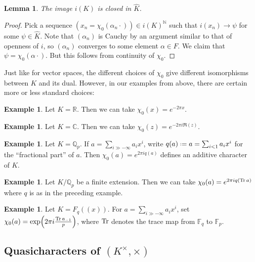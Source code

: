 \documentclass[11pt]{report}
\newcommand{\1}{\mathbbm 1}
\newcommand{\N}{\mathbb{N}}
\newcommand{\Q}{\mathbb{Q}}
\newcommand{\R}{\mathbb{R}}
\newcommand{\F}{\mathbb{F}}
\newcommand{\C}{\mathbb{C}}
\newcommand*{\defeq}{\mathrel{\vcenter{\baselineskip0.5ex \lineskiplimit0pt
      \hbox{\scriptsize.}\hbox{\scriptsize.}}}%
  =}
\theoremstyle{plain}
\newcounter{ex}
\newtheorem{lemma}[thm]{Lemma}
\theoremstyle{definition}
\newtheorem{example}[thm]{Example}
\theoremstyle{remark}
\numberwithin{equation}{section}
\begin{document}
\begin{lemma}
The image $i(K)$ is closed in $\hat K$.
\end{lemma}

\begin{proof}
  Pick a sequence $(x_{n} = \chi_{0}(\alpha_{n}\cdot)) \in i(K)^{\N}$ such that
  $i(x_{n}) \to \psi$ for some $\psi \in \hat K$. Note that
  $(\alpha_{n})$ is Cauchy by an argument similar to that of openness of
  $i$, so $(\alpha_{n})$ converges to some element $\alpha \in
  F$. We claim that $\psi = \chi_{0}(\alpha \cdot)$. But this follows from continuity of $\chi_{0}$.
\end{proof}

Just like for vector spaces, the different choices of $\chi_{0}$ give
different isomorphisms between $K$ and its dual. However, in our
examples from above, there are certain more or less standard choices:


\begin{example}
Let $K = \R$. Then we can take $\chi_{0}(x) = e^{-2\pi x}$.
\end{example}

\begin{example}
Let $K = \C$. Then we can take $\chi_{0}(z) = e^{-2\pi i \Re(z)}$. 
\end{example}

\begin{example}
Let $K = \Q_{p}$. If $a = \sum_{i \gg -\infty}a_{i}x^{i}$, write $q(a) \defeq a
= \sum_{i < 1}a_{i}x^{i}$ for the ``fractional part'' of $a$. Then
$\chi_{0}(a) = e^{2\pi i q(a)}$ defines an additive character of $K$.
\end{example}


\begin{example}
Let $K/\Q_{p}$ be a finite extension. Then we can take $\chi_{0}(a)
 = e^{2\pi i q(\Tr a)}$ where $q$ is as in the preceding example.
\end{example}

\begin{example}
Let $K = F_{q}((x))$. For $a = \sum_{i \gg -\infty} a_{i}x^{i}$, set $\chi_{0}(a) =
\exp(2\pi i \frac{\Tr a_{-1}}{p})$, where $\Tr$ denotes the trace map
from $\F_{q}$ to $\F_{p}$. 
\end{example}

\subsection{Quasicharacters of \texorpdfstring{$(K^{\times},\times)$}{(K,x)}}
\label{sec:quasichars}
\end{document}
